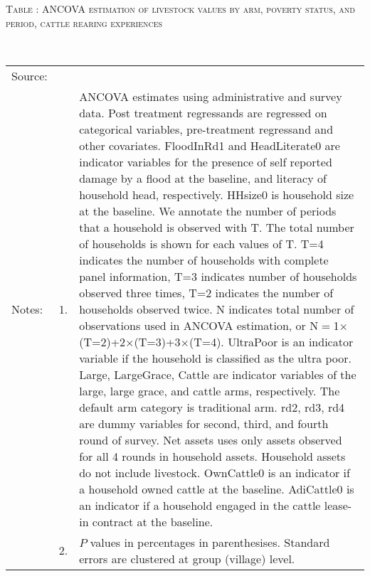 \vspace{-1cm}\hspace{-1cm}\begin{minipage}[t]{14cm}
\hfil\textsc{\normalsize Table \thetable: ANCOVA estimation of livestock values by arm, poverty status, and period, cattle rearing experiences\label{tab ANCOVA Livestock Experience timevarying poverty status}}\\
\setlength{\tabcolsep}{1pt}
\setlength{\baselineskip}{8pt}
\renewcommand{\arraystretch}{.52}
\hfil{}\\
\renewcommand{\arraystretch}{.8}
\setlength{\tabcolsep}{1pt}
\begin{tabular}{>{\hfill\scriptsize}p{1cm}<{}>{\hfill\scriptsize}p{.25cm}<{}>{\scriptsize}p{12cm}<{\hfill}}
Source:& \multicolumn{2}{l}{\scriptsize Estimated with GUK administrative and survey data.}\\
Notes: & 1. & ANCOVA estimates using administrative and survey data. Post treatment regressands are regressed on categorical variables, pre-treatment regressand and other covariates. \textsf{FloodInRd1} and \textsf{HeadLiterate0} are indicator variables for the presence of self reported damage by a flood at the baseline, and literacy of household head, respectively. \textsf{HHsize0} is household size at the baseline. We annotate the number of periods that a household is observed with \textsf{T}. The total number of households is shown for each values of \textsf{T}. \textsf{T=4} indicates the number of households with complete panel information, \textsf{T=3} indicates number of households observed three times, \textsf{T=2} indicates the number of households observed twice. \textsf{N} indicates total number of observations used in ANCOVA estimation, or \textsf{N$=$1$\times$(T=2)+2$\times$(T=3)+3$\times$(T=4)}.  \textsf{UltraPoor} is an indicator variable if the household is classified as the ultra poor. \textsf{Large}, \textsf{LargeGrace}, \textsf{Cattle} are indicator variables of the \textsf{large}, \textsf{large grace}, and \textsf{cattle} arms, respectively. The default arm category is \textsf{traditional} arm. \textsf{rd2, rd3, rd4} are dummy variables for second, third, and fourth round of survey. Net assets uses only assets observed for all 4 rounds in household assets. Household assets do not include livestock. \textsf{OwnCattle0} is an indicator if a household owned cattle at the baseline. \textsf{AdiCattle0} is an indicator if a household engaged in the cattle lease-in contract at the baseline.  \\
& 2. & $P$ values in percentages in parenthesises. Standard errors are clustered at group (village) level.
\end{tabular}
\end{minipage}

